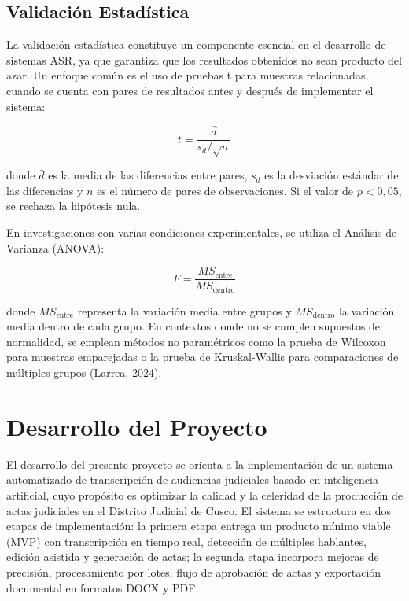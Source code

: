 \documentclass[12pt,a4paper,oneside]{report}
\begin{document}
\subsection{Validación Estadística}

La validación estadística constituye un componente esencial en el desarrollo de sistemas ASR, ya que garantiza que los resultados obtenidos no sean producto del azar. Un enfoque común es el uso de pruebas t para muestras relacionadas, cuando se cuenta con pares de resultados antes y después de implementar el sistema:

\begin{equation}
t = \frac{\bar{d}}{s_d / \sqrt{n}}
\end{equation}

donde $\bar{d}$ es la media de las diferencias entre pares, $s_d$ es la desviación estándar de las diferencias y $n$ es el número de pares de observaciones. Si el valor de $p < 0{,}05$, se rechaza la hipótesis nula.

En investigaciones con varias condiciones experimentales, se utiliza el Análisis de Varianza (ANOVA):

\begin{equation}
F = \frac{MS_{\text{entre}}}{MS_{\text{dentro}}}
\end{equation}

donde $MS_{\text{entre}}$ representa la variación media entre grupos y $MS_{\text{dentro}}$ la variación media dentro de cada grupo. En contextos donde no se cumplen supuestos de normalidad, se emplean métodos no paramétricos como la prueba de Wilcoxon para muestras emparejadas o la prueba de Kruskal-Wallis para comparaciones de múltiples grupos (Larrea, 2024).

\section{Desarrollo del Proyecto}

El desarrollo del presente proyecto se orienta a la implementación de un sistema automatizado de transcripción de audiencias judiciales basado en inteligencia artificial, cuyo propósito es optimizar la calidad y la celeridad de la producción de actas judiciales en el Distrito Judicial de Cusco. El sistema se estructura en dos etapas de implementación: la primera etapa entrega un producto mínimo viable (MVP) con transcripción en tiempo real, detección de múltiples hablantes, edición asistida y generación de actas; la segunda etapa incorpora mejoras de precisión, procesamiento por lotes, flujo de aprobación de actas y exportación documental en formatos DOCX y PDF.
\end{document}
